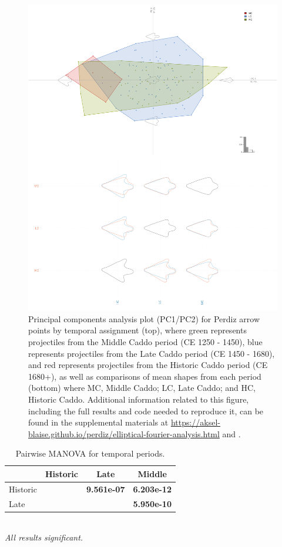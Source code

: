 \documentclass[review]{elsarticle}
\begin{document}
\begin{figure}[!]\centering
\includegraphics[width=0.9\linewidth]{temporal.pdf}
\caption{Principal components analysis plot (PC1/PC2) for Perdiz arrow points by temporal assignment (top), where green represents projectiles from the Middle Caddo period (CE 1250 - 1450), blue represents projectiles from the Late Caddo period (CE 1450 - 1680), and red represents projectiles from the Historic Caddo period (CE 1680+), as well as comparisons of mean shapes from each period (bottom) where MC, Middle Caddo; LC, Late Caddo; and HC, Historic Caddo. Additional information related to this figure, including the full results and code needed to reproduce it, can be found in the supplemental materials at \href{https://aksel-blaise.github.io/perdiz/elliptical-fourier-analysis.html}{https://aksel-blaise.github.io/perdiz/elliptical-fourier-analysis.html} and \citealp{RN8980}.}
\label{fig:gmtemp}
\end{figure}

\begin{table}[tbh]\centering
\footnotesize
\caption{Pairwise MANOVA for temporal periods.}
\centering
\begin{tabular}{lccc}
\hline
 & Historic & Late & Middle\\
\hline
Historic & & \textbf{9.561e-07} & \textbf{6.203e-12}\\
Late & & & \textbf{5.950e-10}\\
\hline
\end{tabular}\\
\textit{All results significant.}
\label{tab:tab.shape.time}
\end{table}
\end{document}
